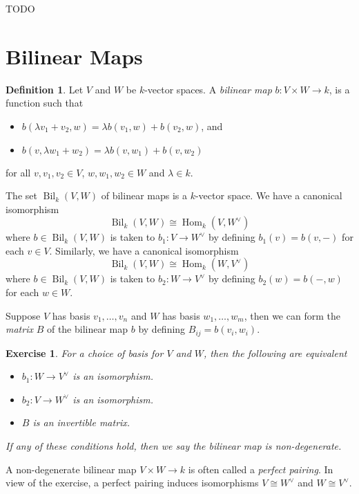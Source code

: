 \documentclass[12pt]{article}
\theoremstyle{plain}
\newtheorem{exercise}[theorem]{Exercise}
\theoremstyle{definition}
\newtheorem{definition}[theorem]{Definition}
\theoremstyle{remark}
\numberwithin{equation}{section}
\begin{document}
TODO

\section{Bilinear Maps}

\begin{definition}
Let $V$ and $W$ be $k$-vector spaces.
A \emph{bilinear map} $b: V \times W \to k$,
is a function such that
\begin{itemize}
\item $b(\lambda v_1+v_2,w) = \lambda b(v_1,w) + b(v_2,w)$, and
\item $b(v,\lambda w_1+w_2) = \lambda b(v,w_1) + b(v,w_2)$
\end{itemize}
for all $v,v_1,v_2 \in V$, $w,w_1,w_2 \in W$ and $\lambda \in k$.
\end{definition}

The set $\operatorname{Bil}_k(V,W)$ of bilinear maps is a $k$-vector
space.
We have a canonical isomorphism
\[
\operatorname{Bil}_k(V,W) \cong
\operatorname{Hom}_k(V,W^\vee)
\]
where $b \in \operatorname{Bil}_k(V,W)$ is taken to $b_1 : V \to W^\vee$
by defining $b_1(v) = b(v,-)$ for each $v \in V$.
Similarly, we have a canonical isomorphism
\[
\operatorname{Bil}_k(V,W) \cong
\operatorname{Hom}_k(W,V^\vee)
\]
where $b \in \operatorname{Bil}_k(V,W)$ is taken to $b_2 : W \to V^\vee$
by defining $b_2(w) = b(-,w)$ for each $w \in W$.

Suppose $V$ has basis $v_1,\ldots,v_n$ and $W$ has basis $w_1,\ldots, w_m$,
then we can form the \emph{matrix} $B$ of the bilinear map $b$ by defining
$B_{ij} = b(v_i,w_i)$.

\begin{exercise}
For a choice of basis for $V$ and $W$, then the following are equivalent
\begin{itemize}
\item $b_1 : W \to V^\vee$ is an isomorphism.
\item $b_2 : V \to W^\vee$ is an isomorphism.
\item $B$ is an invertible matrix.
\end{itemize}
If any of these conditions hold, then we say the bilinear map
is \emph{non-degenerate}.
\end{exercise}

A non-degenerate bilinear map $V \times W \to k$ is often called
a \emph{perfect pairing}.  In view of the exercise, a perfect pairing
induces isomorphisms $V \cong W^\vee$ and $W \cong V^\vee$.
\end{document}
